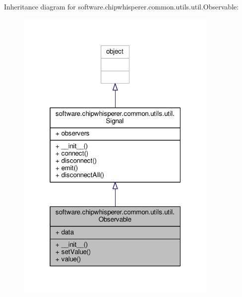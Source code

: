 Inheritance diagram for software.\+chipwhisperer.\+common.\+utils.\+util.\+Observable\+:\nopagebreak
\begin{figure}[H]
\begin{center}
\leavevmode
\includegraphics[width=277pt]{d2/d15/classsoftware_1_1chipwhisperer_1_1common_1_1utils_1_1util_1_1Observable__inherit__graph}
\end{center}
\end{figure}


